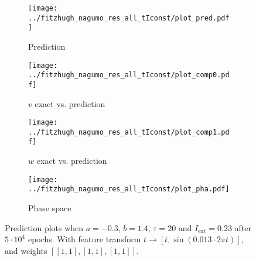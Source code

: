 \documentclass[a4paper]{article}
\begin{document}
\begin{figure}[H]
	\centering 
	\begin{subfigure}[b]{0.47\textwidth}
		\centering
		\texttt{[image: ../fitzhugh\_nagumo\_res\_all\_tIconst/plot\_pred.pdf]}
		\caption{Prediction}
		\label{fig:ab0a}
	\end{subfigure}
	\begin{subfigure}[b]{0.47\textwidth}
		\centering
		\texttt{[image: ../fitzhugh\_nagumo\_res\_all\_tIconst/plot\_comp0.pdf]}
		\caption{$v$ exact vs. prediction}
		\label{fig:ab0b}
	\end{subfigure}
	\begin{subfigure}[b]{0.47\textwidth}
		\centering
		\texttt{[image: ../fitzhugh\_nagumo\_res\_all\_tIconst/plot\_comp1.pdf]}
		\caption{$w$ exact vs. prediction}
		\label{fig:ab0c}
	\end{subfigure}
	\begin{subfigure}[b]{0.47\textwidth}
		\centering
		\texttt{[image: ../fitzhugh\_nagumo\_res\_all\_tIconst/plot\_pha.pdf]}
		\caption{Phase space}
		\label{fig:ab0d}
	\end{subfigure}
	\caption{Prediction plots when $a=-0.3$, $b=1.4$, $\tau=20$ and $ I_{\text{ext}}=0.23$ after $5\cdot10^4$ epochs. With feature transform $t \rightarrow \left[  t, \sin(0.013\cdot 2 \pi t) \right] $, and weights $\left[ \left[ 1, 1\right], \left[ 1, 1\right], \left[ 1, 1\right]\right]$.}
	\label{plot:ab0}
\end{figure}
\end{document}
